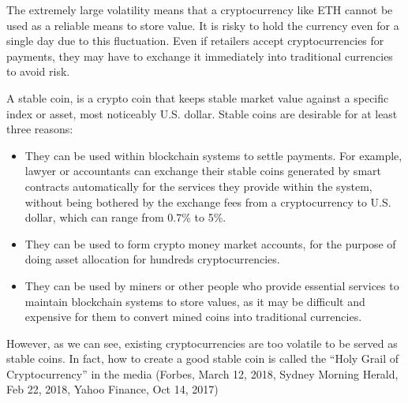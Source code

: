 \documentclass[draft, noinfoline]{ectaart}
\numberwithin{equation}{section}
\theoremstyle{plain}
\begin{document}
The extremely large volatility means that a cryptocurrency like ETH cannot be used as a reliable means to store value. It is risky to hold the currency even for a single day due to this fluctuation. Even if retailers accept cryptocurrencies for payments, they may have to exchange it immediately into traditional currencies to avoid risk.



A stable coin, is a crypto coin that keeps stable market value against a specific index or asset, most noticeably U.S. dollar. Stable coins are desirable for at least three reasons:
\begin{itemize}
\item They can be used within blockchain systems to settle payments. For example, lawyer or accountants can exchange their stable coins generated by smart contracts automatically for the services they provide within the system, without being bothered by the exchange fees from a cryptocurrency to U.S. dollar, which can range from 0.7\% to 5\%.
\item  They can be used to form crypto money market accounts, for the purpose of doing asset allocation for hundreds cryptocurrencies.
\item They can be used by miners or other people who provide essential services to maintain blockchain systems to store values, as it may be difficult and expensive for them to convert mined coins into traditional currencies.
\end{itemize}
However, as we can see, existing cryptocurrencies are too volatile to be served as stable coins.
In fact, how to create a good stable coin is called the ``Holy Grail of Cryptocurrency'' in the media (Forbes, March 12, 2018,
Sydney Morning Herald, Feb 22, 2018, Yahoo Finance, Oct 14, 2017)
\end{document}
